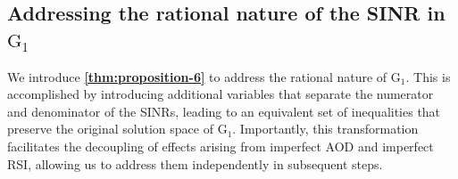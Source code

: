 \documentclass[10pt,journal,compsoc]{IEEEtran}
\theoremstyle{myremark}
\theoremstyle{myexample}
\begin{document}
\subsection{Addressing the rational nature of the SINR in $ \mathrm{G}_{1} $}

We introduce \textbf{\cref{thm:proposition-6}} to address the rational nature of $ \mathrm{G}_{1} $. This is accomplished by introducing additional variables that separate the numerator and denominator of the \glspl{SINR}, leading to an equivalent set of inequalities that preserve the original solution space of $ \mathrm{G}_{1} $. Importantly, this transformation facilitates the decoupling of effects arising from imperfect \gls{AOD} and imperfect \gls{RSI}, allowing us to address them independently in subsequent steps.
\end{document}
